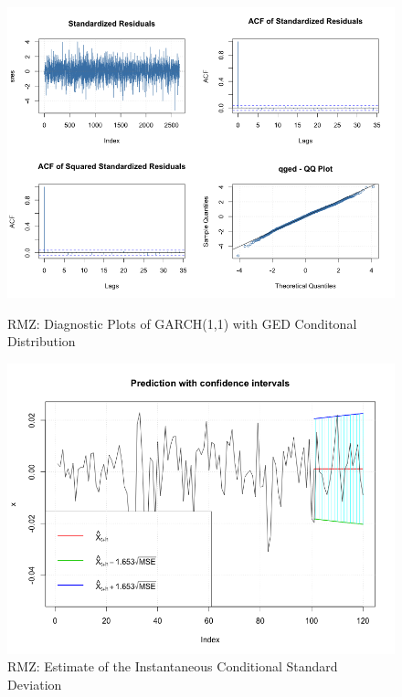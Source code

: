 \documentclass[11pt]{article}
\begin{document}
\begin{figure}[H]
  \centering
  \begin{minipage}[b]{0.48\textwidth}
  \includegraphics[width = \textwidth]{../results/RMZ_GARCH_dig2}
  \caption{RMZ: Diagnostic Plots of GARCH(1,1) with GED Conditonal Distribution}
  \label{fig:RMZ_GARCH_dig2}
  \end{minipage}
  \hfill
  \begin{minipage}[b]{0.48\textwidth}
   \includegraphics[width = \textwidth]{../results/RMZ_GARCH_predCI}
  \caption{RMZ: Estimate of the Instantaneous Conditional Standard Deviation}
  \label{fig:RMZ_GARCH_predCI}
  \end{minipage}
\end{figure}
\end{document}
